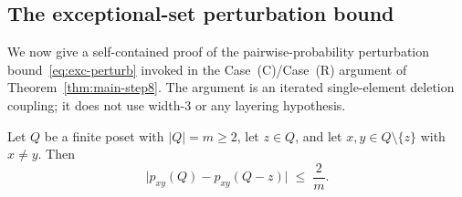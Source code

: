 \subsection{The exceptional-set perturbation bound}
\label{sec:exc-perturb}

We now give a self-contained proof of the pairwise-probability
perturbation bound~\eqref{eq:exc-perturb} invoked in the
Case~(C)/Case~(R) argument of Theorem~\ref{thm:main-step8}. The
argument is an iterated single-element deletion coupling; it does not
use width-$3$ or any layering hypothesis.

\begin{lemma}
\label{lem:one-elem-perturb}
Let $Q$ be a finite poset with $|Q| = m \ge 2$, let $z \in Q$, and let
$x, y \in Q \setminus \{z\}$ with $x \ne y$. Then
\begin{equation}\label{eq:one-elem-perturb}
  \big|p_{xy}(Q) - p_{xy}(Q - z)\big| \;\le\; \frac{2}{m}.
\end{equation}
\end{lemma}

